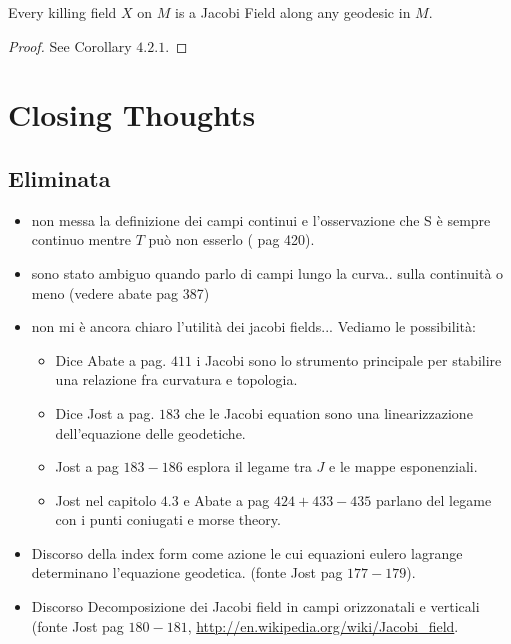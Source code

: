 \documentclass[a4paper,12pt]{scrartcl}    %
\begin{document}
\begin{proposition}
Every killing field $X$ on $M$ is a Jacobi Field along any geodesic in $M$.
\end{proposition}
\begin{proof}
 See \cite{Jost2005} Corollary $4.2.1$.
\end{proof}





\newpage
\section{Closing Thoughts}

\subsection{Eliminata}
\begin{itemize}

\item non messa la definizione dei campi continui e l'osservazione che S  è sempre continuo mentre $T$ può non esserlo (\cite{Abate2011} pag 420).

\item sono stato ambiguo quando parlo di campi lungo la curva.. sulla continuità o meno (vedere abate pag 387)

\item non mi è ancora chiaro l'utilità dei jacobi fields... Vediamo le possibilità:
	\begin{itemize}
	\item Dice Abate a pag. $411$ i Jacobi sono lo strumento principale per stabilire una relazione fra curvatura e topologia.
	\item Dice Jost a pag. $183$ che le Jacobi equation sono una linearizzazione dell'equazione delle geodetiche.
	\item Jost a pag $183-186$ esplora il legame tra $J$  e le mappe esponenziali.
	\item Jost nel capitolo $4.3$ e  Abate a pag $424 + 433-435$ parlano del legame con i punti coniugati e morse theory.
	\end{itemize}

\item Discorso della index form come azione le cui equazioni eulero lagrange determinano l'equazione geodetica. (fonte Jost pag $177-179$).

\item Discorso Decomposizione dei Jacobi field in campi orizzonatali e verticali (fonte Jost pag $180-181$, \url{http://en.wikipedia.org/wiki/Jacobi_field}.


\end{itemize}



\end{document}
